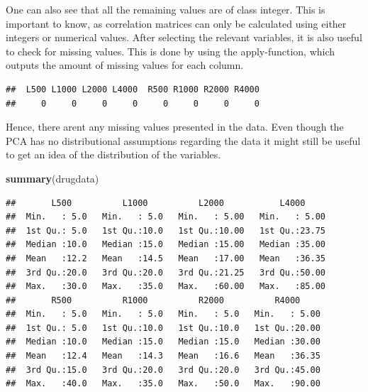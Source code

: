 \documentclass[]{article}
\newenvironment{Shaded}{\begin{snugshade}}{\end{snugshade}}
\newcommand{\KeywordTok}[1]{\textcolor[rgb]{0.13,0.29,0.53}{\textbf{#1}}}
\newcommand{\DecValTok}[1]{\textcolor[rgb]{0.00,0.00,0.81}{#1}}
\newcommand{\StringTok}[1]{\textcolor[rgb]{0.31,0.60,0.02}{#1}}
\newcommand{\ControlFlowTok}[1]{\textcolor[rgb]{0.13,0.29,0.53}{\textbf{#1}}}
\newcommand{\OperatorTok}[1]{\textcolor[rgb]{0.81,0.36,0.00}{\textbf{#1}}}
\newcommand{\NormalTok}[1]{#1}
\begin{document}
One can also see that all the remaining values are of class integer.
This is important to know, as correlation matrices can only be
calculated using either integers or numerical values. After selecting
the relevant variables, it is also useful to check for missing values.
This is done by using the apply-function, which outputs the amount of
missing values for each column.

\begin{Shaded}
\end{Shaded}

\begin{verbatim}
##  L500 L1000 L2000 L4000  R500 R1000 R2000 R4000 
##     0     0     0     0     0     0     0     0
\end{verbatim}

Hence, there arent any missing values presented in the data. Even though
the PCA has no distributional assumptions regarding the data it might
still be useful to get an idea of the distribution of the variables.

\begin{Shaded}
\begin{Highlighting}[]
\KeywordTok{summary}\NormalTok{(drugdata)}
\end{Highlighting}
\end{Shaded}

\begin{verbatim}
##       L500          L1000          L2000           L4000      
##  Min.   : 5.0   Min.   : 5.0   Min.   : 5.00   Min.   : 5.00  
##  1st Qu.: 5.0   1st Qu.:10.0   1st Qu.:10.00   1st Qu.:23.75  
##  Median :10.0   Median :15.0   Median :15.00   Median :35.00  
##  Mean   :12.2   Mean   :14.5   Mean   :17.00   Mean   :36.35  
##  3rd Qu.:20.0   3rd Qu.:20.0   3rd Qu.:21.25   3rd Qu.:50.00  
##  Max.   :30.0   Max.   :35.0   Max.   :60.00   Max.   :85.00  
##       R500          R1000          R2000          R4000      
##  Min.   : 5.0   Min.   : 5.0   Min.   : 5.0   Min.   : 5.00  
##  1st Qu.: 5.0   1st Qu.:10.0   1st Qu.:10.0   1st Qu.:20.00  
##  Median :10.0   Median :15.0   Median :15.0   Median :30.00  
##  Mean   :12.4   Mean   :14.3   Mean   :16.6   Mean   :36.35  
##  3rd Qu.:15.0   3rd Qu.:20.0   3rd Qu.:20.0   3rd Qu.:45.00  
##  Max.   :40.0   Max.   :35.0   Max.   :50.0   Max.   :90.00
\end{verbatim}
\end{document}
